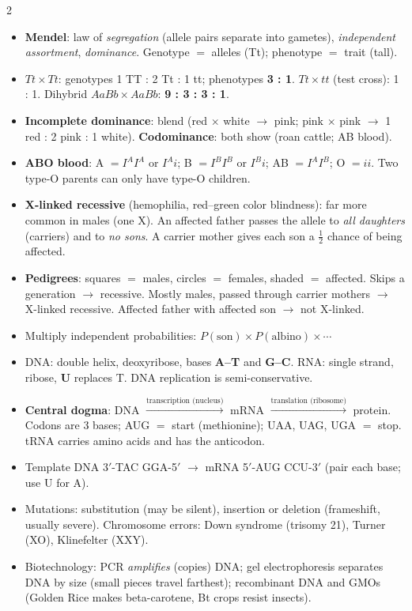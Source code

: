 \documentclass[10pt]{article}
\makeatletter
\newcommand{\sub}[1]{\par\vspace{2.5pt}{\sffamily\bfseries\color{dblue}#1}\par\nobreak\vspace{0.5pt}\@afterheading}
\newcommand{\term}[1]{\textbf{\color{dnavy}#1}}
\makeatother
\begin{document}
\begin{multicols}{2}
\sub{F. Genetics}
\begin{itemize}
\item \term{Mendel}: law of \emph{segregation} (allele pairs separate into gametes), \emph{independent assortment}, \emph{dominance}. Genotype $=$ alleles (Tt); phenotype $=$ trait (tall).
\item $Tt\times Tt$: genotypes 1 TT : 2 Tt : 1 tt; phenotypes \textbf{3 : 1}. $Tt\times tt$ (test cross): 1 : 1. Dihybrid $AaBb\times AaBb$: \textbf{9 : 3 : 3 : 1}.
\item \term{Incomplete dominance}: blend (red $\times$ white $\to$ pink; pink $\times$ pink $\to$ 1 red : 2 pink : 1 white). \term{Codominance}: both show (roan cattle; AB blood).
\item \term{ABO blood}: A $=I^AI^A$ or $I^Ai$; B $=I^BI^B$ or $I^Bi$; AB $=I^AI^B$; O $=ii$. Two type-O parents can only have type-O children.
\item \term{X-linked recessive} (hemophilia, red--green color blindness): far more common in males (one X). An affected father passes the allele to \emph{all daughters} (carriers) and to \emph{no sons}. A carrier mother gives each son a $\frac12$ chance of being affected.
\item \term{Pedigrees}: squares $=$ males, circles $=$ females, shaded $=$ affected. Skips a generation $\to$ recessive. Mostly males, passed through carrier mothers $\to$ X-linked recessive. Affected father with affected son $\to$ not X-linked.
\item Multiply independent probabilities: $P(\text{son})\times P(\text{albino})\times\cdots$
\end{itemize}

\sub{G. DNA, RNA, and proteins}
\begin{itemize}
\item DNA: double helix, deoxyribose, bases \textbf{A--T} and \textbf{G--C}. RNA: single strand, ribose, \textbf{U} replaces T. DNA replication is semi-conservative.
\item \term{Central dogma}: DNA $\xrightarrow{\text{transcription (nucleus)}}$ mRNA $\xrightarrow{\text{translation (ribosome)}}$ protein. Codons are 3 bases; AUG $=$ start (methionine); UAA, UAG, UGA $=$ stop. tRNA carries amino acids and has the anticodon.
\item Template DNA 3$'$-TAC GGA-5$'$ $\to$ mRNA 5$'$-AUG CCU-3$'$ (pair each base; use U for A).
\item Mutations: substitution (may be silent), insertion or deletion (frameshift, usually severe). Chromosome errors: Down syndrome (trisomy 21), Turner (XO), Klinefelter (XXY).
\item Biotechnology: PCR \emph{amplifies} (copies) DNA; gel electrophoresis separates DNA by size (small pieces travel farthest); recombinant DNA and GMOs (Golden Rice makes beta-carotene, Bt crops resist insects).
\end{itemize}


\end{multicols}
\end{document}
